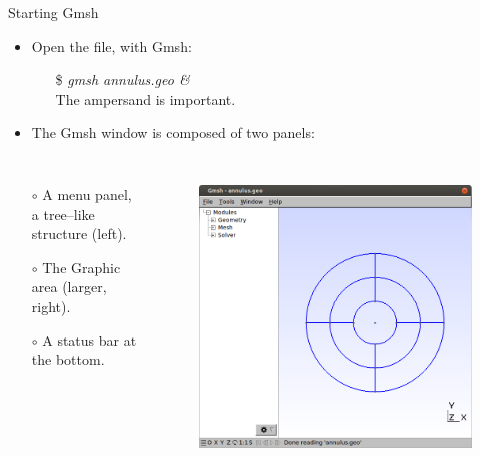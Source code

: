 \documentclass[t]{beamer}
\begin{document}
\begin{frame}{Starting Gmsh}
  \begin{itemize} 
     \item Open the file, with Gmsh:
     \begin{itemize} 
         \item[\$] \emph{gmsh annulus.geo \&} \\ \hspace{10pt} The ampersand is important.
     \end{itemize} 
     \item The Gmsh window is composed of two panels:
  \end{itemize}
\vspace{-15pt}
\begin{columns}[l]
\column{2.3in}
  \begin{itemize} 
        \item[$\circ$] A menu panel, a tree--like structure (left).
        \item[$\circ$] The Graphic area (larger, right).
        \item[$\circ$] A status bar at the bottom.
  \end{itemize}
\column{2.2in}
\vspace{-5pt}
\begin{figure}[htbp!]
 \centering
  \includegraphics[width=1.0\textwidth]{../figures/annulus1}
  \label{fig:annulus1}
\end{figure}
\end{columns}
\end{frame}
\end{document}
